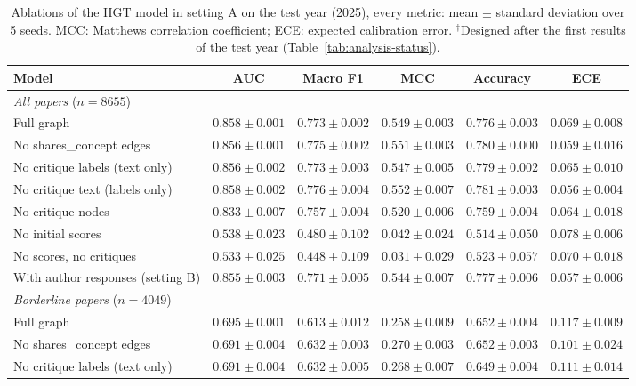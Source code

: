 \begin{table}[t]
\centering
\footnotesize
\caption{Ablations of the HGT model in setting A on the test year (2025), every metric: mean $\pm$ standard deviation over 5 seeds. MCC: Matthews correlation coefficient; ECE: expected calibration error. $^{\dagger}$Designed after the first results of the test year (Table~\ref{tab:analysis-status}).}
\label{tab:ablations-full}
\begin{tabular}{lccccc}
\toprule
Model & AUC & Macro F1 & MCC & Accuracy & ECE \\
\midrule
\multicolumn{6}{l}{\emph{All papers} ($n = 8655$)} \\
Full graph & $0.858 \pm 0.001$ & $0.773 \pm 0.002$ & $0.549 \pm 0.003$ & $0.776 \pm 0.003$ & $0.069 \pm 0.008$ \\
No shares\_concept edges & $0.856 \pm 0.001$ & $0.775 \pm 0.002$ & $0.551 \pm 0.003$ & $0.780 \pm 0.000$ & $0.059 \pm 0.016$ \\
No critique labels (text only) & $0.856 \pm 0.002$ & $0.773 \pm 0.003$ & $0.547 \pm 0.005$ & $0.779 \pm 0.002$ & $0.065 \pm 0.010$ \\
No critique text (labels only) & $0.858 \pm 0.002$ & $0.776 \pm 0.004$ & $0.552 \pm 0.007$ & $0.781 \pm 0.003$ & $0.056 \pm 0.004$ \\
No critique nodes & $0.833 \pm 0.007$ & $0.757 \pm 0.004$ & $0.520 \pm 0.006$ & $0.759 \pm 0.004$ & $0.064 \pm 0.018$ \\
No initial scores & $0.538 \pm 0.023$ & $0.480 \pm 0.102$ & $0.042 \pm 0.024$ & $0.514 \pm 0.050$ & $0.078 \pm 0.006$ \\
No scores, no critiques & $0.533 \pm 0.025$ & $0.448 \pm 0.109$ & $0.031 \pm 0.029$ & $0.523 \pm 0.057$ & $0.070 \pm 0.018$ \\
With author responses (setting B) & $0.855 \pm 0.003$ & $0.771 \pm 0.005$ & $0.544 \pm 0.007$ & $0.777 \pm 0.006$ & $0.057 \pm 0.006$ \\
\midrule
\multicolumn{6}{l}{\emph{Borderline papers} ($n = 4049$)} \\
Full graph & $0.695 \pm 0.001$ & $0.613 \pm 0.012$ & $0.258 \pm 0.009$ & $0.652 \pm 0.004$ & $0.117 \pm 0.009$ \\
No shares\_concept edges & $0.691 \pm 0.004$ & $0.632 \pm 0.003$ & $0.270 \pm 0.003$ & $0.652 \pm 0.003$ & $0.101 \pm 0.024$ \\
No critique labels (text only) & $0.691 \pm 0.004$ & $0.632 \pm 0.005$ & $0.268 \pm 0.007$ & $0.649 \pm 0.004$ & $0.111 \pm 0.014$ \\

\end{tabular}
\end{table}
